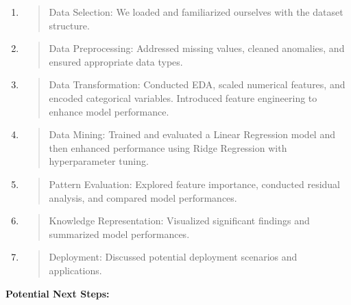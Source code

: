 \documentclass[]{article}
\newcommand{\textcenter}[1]{\begin{center} \vspace{10px}\textbf{\large #1} \end{center}}
\begin{document}
\begin{enumerate}
\def\labelenumi{\arabic{enumi}.}
\item
  \begin{quote}
  Data Selection: We loaded and familiarized ourselves with the dataset
  structure.
  \end{quote}
\item
  \begin{quote}
  Data Preprocessing: Addressed missing values, cleaned anomalies, and
  ensured appropriate data types.
  \end{quote}
\item
  \begin{quote}
  Data Transformation: Conducted EDA, scaled numerical features, and
  encoded categorical variables. Introduced feature engineering to
  enhance model performance.
  \end{quote}
\item
  \begin{quote}
  Data Mining: Trained and evaluated a Linear Regression model and then
  enhanced performance using Ridge Regression with hyperparameter
  tuning.
  \end{quote}
\item
  \begin{quote}
  Pattern Evaluation: Explored feature importance, conducted residual
  analysis, and compared model performances.
  \end{quote}
\item
  \begin{quote}
  Knowledge Representation: Visualized significant findings and
  summarized model performances.
  \end{quote}
\item
  \begin{quote}
  Deployment: Discussed potential deployment scenarios and applications.
  \end{quote}
\end{enumerate}

\textcenter{Potential Next Steps:}
\end{document}
